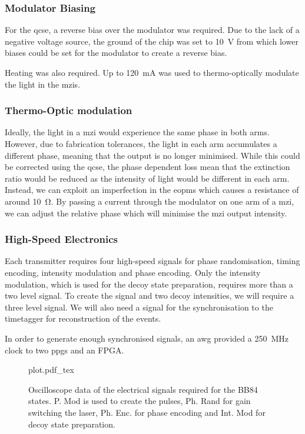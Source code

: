 \subsubsection*{Modulator Biasing}

For the \ac{qcse}, a reverse bias over the modulator was required. Due to the lack of a negative voltage source, the ground of the chip was set to \SI{10}{V} from which lower biases could be set for the modulator to create a reverse bias.

Heating was also required. Up to \SI{120}{mA} was used to thermo-optically modulate the light in the \acp{mzi}.

\subsubsection*{Thermo-Optic modulation}

Ideally, the light in a \ac{mzi} would experience the same phase in both arms. However, due to fabrication tolerances, the light in each arm accumulates a different phase, meaning that the output is no longer minimised. While this could be corrected using the \ac{qcse}, the phase dependent loss mean that the extinction ratio would be reduced as the intensity of light would be different in each arm. Instead, we can exploit an imperfection in the \acp{eopm} which causes a resistance of around \SI{10}{\ohm}. By passing a current through the modulator on one arm of a \ac{mzi}, we can adjust the relative phase which will minimise the \ac{mzi} output intensity.

\subsubsection*{High-Speed Electronics}

Each transmitter requires four high-speed signals for phase randomisation, timing encoding, intensity modulation and phase encoding. Only the intensity modulation, which is used for the decoy state preparation, requires more than a two level signal. To create the signal and two decoy intensities, we will require a three level signal. We will also need a signal for the synchronisation to the timetagger for reconstruction of the events. 

In order to generate enough synchronised signals, an \ac{awg} provided a \SI{250}{\MHz} clock to two \acp{ppg} and an FPGA. 

\begin{figure}[tbp]
	\centering
	\def\svgwidth{\textwidth} 
	{plot.pdf_tex}
	\caption[Electrical signals for BB84 state generation]{Oscilloscope data of the electrical signals required for the BB84 states. P. Mod is used to create the pulses, Ph. Rand for gain switching the laser, Ph. Enc. for phase encoding and Int. Mod for decoy state preparation.}
	\label{fig:elec_signals}
\end{figure}

